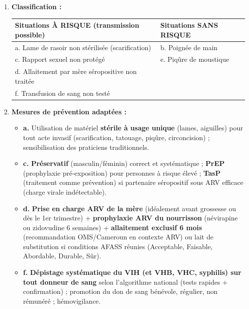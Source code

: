 \documentclass[11pt]{article}
\begin{document}
\begin{corrige}
\begin{enumerate}
\item \textbf{Classification :}
\begin{center}
\begin{tabularx}{\linewidth}{|l|X|}\hline
\rowcolor{popblueL} \textbf{Situations À RISQUE} (transmission possible) & \textbf{Situations SANS RISQUE} \\ \hline
a. Lame de rasoir non stérilisée (scarification) & b. Poignée de main \\ \hline
c. Rapport sexuel non protégé & e. Piqûre de moustique \\ \hline
d. Allaitement par mère séropositive non traitée & \\ \hline
f. Transfusion de sang non testé & \\ \hline
\end{tabularx}
\end{center}
\item \textbf{Mesures de prévention adaptées :}
\begin{itemize}
\item \textbf{a.} Utilisation de matériel \textbf{stérile à usage unique} (lames, aiguilles) pour tout acte invasif (scarification, tatouage, piqûre, circoncision) ; sensibilisation des praticiens traditionnels.
\item \textbf{c.} \textbf{Préservatif} (masculin/féminin) correct et systématique ; \textbf{PrEP} (prophylaxie pré-exposition) pour personnes à risque élevé ; \textbf{TasP} (traitement comme prévention) si partenaire séropositif sous ARV efficace (charge virale indétectable).
\item \textbf{d.} \textbf{Prise en charge ARV de la mère} (idéalement avant grossesse ou dès le 1er trimestre) + \textbf{prophylaxie ARV du nourrisson} (névirapine ou zidovudine 6 semaines) + \textbf{allaitement exclusif 6 mois} (recommandation OMS/Cameroun en contexte ARV) ou lait de substitution si conditions AFASS réunies (Acceptable, Faisable, Abordable, Durable, Sûr).
\item \textbf{f.} \textbf{Dépistage systématique du VIH (et VHB, VHC, syphilis) sur tout donneur de sang} selon l'algorithme national (tests rapides + confirmation) ; promotion du don de sang bénévole, régulier, non rémunéré ; hémovigilance.
\end{itemize}
\end{enumerate}
\end{corrige}
\end{document}
